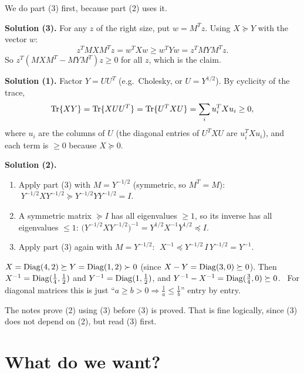 We do part (3) first, because part (2) uses it.

\textbf{Solution (3).} For any $z$ of the right size, put $w=M^Tz$. Using $X\succeq Y$ with the vector $w$:
\[ z^TMXM^Tz = w^TXw \ge w^TYw = z^TMYM^Tz. \]
So $z^T(MXM^T-MYM^T)z\ge0$ for all $z$, which is the claim.

\textbf{Solution (1).} Factor $Y=UU^T$ (e.g.\ Cholesky, or $U=Y^{1/2}$). By cyclicity of the trace,
\[ \operatorname{Tr}\{XY\} = \operatorname{Tr}\{XUU^T\} = \operatorname{Tr}\{U^TXU\} = \sum_iu_i^TXu_i\ge0, \]
where $u_i$ are the columns of $U$ (the diagonal entries of $U^TXU$ are $u_i^TXu_i$), and each term is $\ge0$ because $X\succeq0$.

\textbf{Solution (2).}
\begin{enumerate}
  \item Apply part (3) with $M=Y^{-1/2}$ (symmetric, so $M^T=M$): $\;Y^{-1/2}XY^{-1/2}\succeq Y^{-1/2}YY^{-1/2} = I$.
  \item A symmetric matrix $\succeq I$ has all eigenvalues $\ge1$, so its inverse has all eigenvalues $\le1$:
        $\big(Y^{-1/2}XY^{-1/2}\big)^{-1} = Y^{1/2}X^{-1}Y^{1/2}\preceq I$.
  \item Apply part (3) again with $M=Y^{-1/2}$: $\;X^{-1}\preceq Y^{-1/2}\,I\,Y^{-1/2} = Y^{-1}$.
\end{enumerate}

\begin{example}
$X=\operatorname{Diag}(4,2)\succeq Y=\operatorname{Diag}(1,2)\succ0$ (since $X-Y=\operatorname{Diag}(3,0)\succeq0$). Then $X^{-1}=\operatorname{Diag}(\frac14,\frac12)$ and $Y^{-1}=\operatorname{Diag}(1,\frac12)$,
and $Y^{-1}-X^{-1}=\operatorname{Diag}(\frac34,0)\succeq0$. \checkmark\ For diagonal matrices this is just ``$a\ge b>0\Rightarrow\frac1a\le\frac1b$'' entry by entry.
\end{example}

\begin{pitfall}
The notes prove (2) using (3) before (3) is proved. That is fine logically, since (3) does not depend on (2), but read (3) first.
\end{pitfall}


\section{What do we want?}

